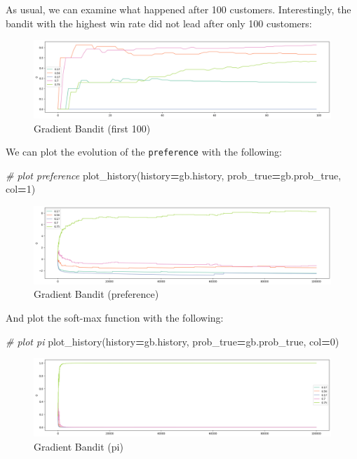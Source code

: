 \documentclass[
]{book}
\newenvironment{Shaded}{\begin{snugshade}}{\end{snugshade}}
\newcommand{\CommentTok}[1]{\textcolor[rgb]{0.56,0.35,0.01}{\textit{#1}}}
\newcommand{\DecValTok}[1]{\textcolor[rgb]{0.00,0.00,0.81}{#1}}
\newcommand{\NormalTok}[1]{#1}
\newcommand{\OperatorTok}[1]{\textcolor[rgb]{0.81,0.36,0.00}{\textbf{#1}}}
\theoremstyle{definition}
\theoremstyle{definition}
\theoremstyle{definition}
\theoremstyle{definition}
\theoremstyle{remark}
\begin{document}
As usual, we can examine what happened after 100 customers. Interestingly, the bandit with the highest win rate did not lead after only 100 customers:

\begin{figure}
\centering
\includegraphics{images/gb_100.png}
\caption{Gradient Bandit (first 100)}
\end{figure}

We can plot the evolution of the \texttt{preference} with the following:

\begin{Shaded}
\begin{Highlighting}[]
\CommentTok{\# plot preference}
\NormalTok{plot\_history(history}\OperatorTok{=}\NormalTok{gb.history, prob\_true}\OperatorTok{=}\NormalTok{gb.prob\_true, col}\OperatorTok{=}\DecValTok{1}\NormalTok{)}
\end{Highlighting}
\end{Shaded}

\begin{figure}
\centering
\includegraphics{images/gb_pref.png}
\caption{Gradient Bandit (preference)}
\end{figure}

And plot the soft-max function with the following:

\begin{Shaded}
\begin{Highlighting}[]
\CommentTok{\# plot pi}
\NormalTok{plot\_history(history}\OperatorTok{=}\NormalTok{gb.history, prob\_true}\OperatorTok{=}\NormalTok{gb.prob\_true, col}\OperatorTok{=}\DecValTok{0}\NormalTok{)}
\end{Highlighting}
\end{Shaded}

\begin{figure}
\centering
\includegraphics{images/gb_pi.png}
\caption{Gradient Bandit (pi)}
\end{figure}
\end{document}
